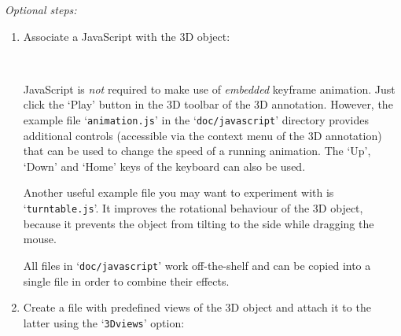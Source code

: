 \documentclass[a4paper]{article}
\begin{document}
\emph{Optional steps:}

\begin{enumerate}
  \setcounter{enumi}{\lastcount}
  \item Associate a JavaScript with the 3D object:

  {\tt%
    \string{}\string{\\
	\phantom{xx}.5\string\linewidth\\
	\string}\string{\\
	\phantom{xx}.5\string\linewidth\\
	\string}
  }

  JavaScript is \emph{not} required to make use of \emph{embedded} keyframe animation. Just click the `Play' button in the 3D toolbar of the 3D annotation. However, the example file `{\tt{}animation.js}' in the `{\tt{}doc/javascript}' directory provides additional controls (accessible via the context menu of the 3D annotation) that can be used to change the speed of a running animation. The `Up', `Down' and `Home' keys of the keyboard can also be used.
  
  Another useful example file you may want to experiment with is `{\tt{}turn\-table.js}'. It improves the rotational behaviour of the 3D object, because it prevents the object from tilting to the side while dragging the mouse.

  All files in `{\tt{}doc/javascript}' work off-the-shelf and can be copied into a single file in order to combine their effects.

  \item Create a file with predefined views of the 3D object and attach it to the latter using the `{\tt{}3Dviews}' option:

  {\tt%
    \string{}\string{\\
	\phantom{xx}.5\string\linewidth\\
	\string}\string{\\
	\phantom{xx}.5\string\linewidth\\
	\string}
  }


\end{enumerate}
\end{document}
